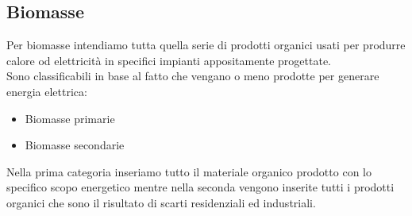 \subsection{Biomasse}
Per biomasse intendiamo tutta quella serie di prodotti organici usati per produrre calore od elettricità in specifici impianti appositamente progettate.\\
Sono classificabili in base al fatto che vengano o meno prodotte per generare energia elettrica\cite{IRENA}:
\begin{itemize}
    \item Biomasse primarie
    \item Biomasse secondarie
\end{itemize}
\noindent
Nella prima categoria inseriamo tutto il materiale organico prodotto con lo specifico scopo energetico mentre nella seconda vengono inserite tutti i prodotti organici che sono il risultato di scarti residenziali ed industriali.

